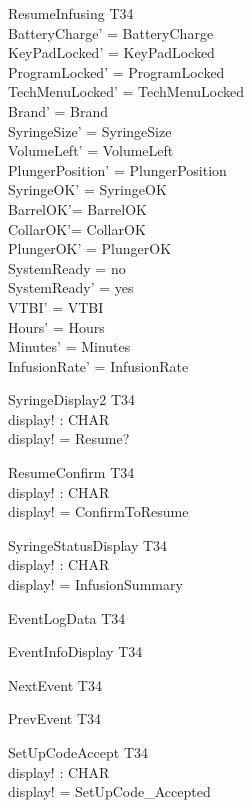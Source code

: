\documentclass[landscape]{article}
\begin{document}
\begin{schema} {ResumeInfusing}
\Delta T34\\
\where
BatteryCharge' =  BatteryCharge \\
KeyPadLocked' = KeyPadLocked\\
ProgramLocked' = ProgramLocked \\
TechMenuLocked' = TechMenuLocked\\
Brand' = Brand\\ 
SyringeSize' = SyringeSize\\
VolumeLeft' = VolumeLeft\\
PlungerPosition' = PlungerPosition \\
SyringeOK' = SyringeOK\\
BarrelOK'= BarrelOK\\
CollarOK'= CollarOK\\
PlungerOK' = PlungerOK \\
SystemReady = no\\
SystemReady' = yes\\
VTBI' = VTBI\\
Hours' = Hours\\
Minutes' = Minutes\\
InfusionRate' = InfusionRate\\
\end{schema}

\begin{schema} {SyringeDisplay2}
\Xi T34\\
display! : CHAR\\
\where
display! = Resume?\\
\end{schema}

\begin{schema} {ResumeConfirm}
\Xi T34\\
display! : CHAR\\
\where
display! = ConfirmToResume\\
\end{schema}

\begin{schema} {SyringeStatusDisplay}
\Xi T34\\
display! : CHAR\\
\where
display! = InfusionSummary\\
\end{schema}


\begin{schema} {EventLogData}
\Xi T34\\
\end{schema}

\begin{schema} {EventInfoDisplay}
\Xi T34\\
\end{schema}

\begin{schema} {NextEvent}
\Xi T34\\
\end{schema}

\begin{schema} {PrevEvent}
\Xi T34\\
\end{schema}


\begin{schema} {SetUpCodeAccept}
\Xi T34\\
display! : CHAR\\
\where
display! = SetUpCode\_Accepted\\
\end{schema}
\end{document}
